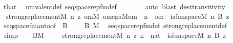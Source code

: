 \begin{isabellebody}
\ \ \ \ \isamarkupfalse%
\ that\ \isamarkupfalse%
\ univalent{\isacharunderscore}{\kern0pt}def\ seqspace{\isacharunderscore}{\kern0pt}rep{\isacharunderscore}{\kern0pt}fm{\isacharunderscore}{\kern0pt}def\ \ \isanewline
\ \ \ \ \isamarkupfalse%
\ {\isacharparenleft}{\kern0pt}auto{\isacharcomma}{\kern0pt}\ blast\ dest{\isacharcolon}{\kern0pt}transitivity{\isacharparenright}{\kern0pt}\isanewline
\ \ \isamarkupfalse%
\isanewline
\ \ \isamarkupfalse%
\ {\isachardoublequoteopen}strong{\isacharunderscore}{\kern0pt}replacement{\isacharparenleft}{\kern0pt}{\isacharhash}{\kern0pt}{\isacharhash}{\kern0pt}M{\isacharcomma}{\kern0pt}\ {\isasymlambda}n\ z{\isachardot}{\kern0pt}\ {\isasymexists}om{\isacharbrackleft}{\kern0pt}{\isacharhash}{\kern0pt}{\isacharhash}{\kern0pt}M{\isacharbrackright}{\kern0pt}{\isachardot}{\kern0pt}\ omega{\isacharparenleft}{\kern0pt}{\isacharhash}{\kern0pt}{\isacharhash}{\kern0pt}M{\isacharcomma}{\kern0pt}om{\isacharparenright}{\kern0pt}\ {\isasymand}\ n\ {\isasymin}\ om\ {\isasymand}\ is{\isacharunderscore}{\kern0pt}funspace{\isacharparenleft}{\kern0pt}{\isacharhash}{\kern0pt}{\isacharhash}{\kern0pt}M{\isacharcomma}{\kern0pt}\ n{\isacharcomma}{\kern0pt}\ B{\isacharcomma}{\kern0pt}\ z{\isacharparenright}{\kern0pt}{\isacharparenright}{\kern0pt}{\isachardoublequoteclose}\isanewline
\ \ \ \ \isamarkupfalse%
\ seqspace{\isacharunderscore}{\kern0pt}fm{\isacharunderscore}{\kern0pt}auto{\isacharbrackleft}{\kern0pt}of\ {}\ {\isachardoublequoteopen}{\isacharbrackleft}{\kern0pt}{\isacharunderscore}{\kern0pt}{\isacharcomma}{\kern0pt}{\isacharunderscore}{\kern0pt}{\isacharcomma}{\kern0pt}B{\isacharbrackright}{\kern0pt}{\isachardoublequoteclose}\ {\isacharunderscore}{\kern0pt}\ {}\ {\isacharunderscore}{\kern0pt}\ {}\ B\ M{\isacharbrackright}{\kern0pt}\ \isamarkupfalse%
\ seqspace{\isacharunderscore}{\kern0pt}rep{\isacharunderscore}{\kern0pt}fm{\isacharunderscore}{\kern0pt}def\ strong{\isacharunderscore}{\kern0pt}replacement{\isacharunderscore}{\kern0pt}def\isanewline
\ \ \ \ \isamarkupfalse%
\ simp\isanewline
\ \ \isamarkupfalse%
\ {\isacartoucheopen}B{\isasymin}M{\isacartoucheclose}\ \isanewline
\ \ \isamarkupfalse%
\ {\isachardoublequoteopen}strong{\isacharunderscore}{\kern0pt}replacement{\isacharparenleft}{\kern0pt}{\isacharhash}{\kern0pt}{\isacharhash}{\kern0pt}M{\isacharcomma}{\kern0pt}\ {\isasymlambda}n\ z{\isachardot}{\kern0pt}\ n\ {\isasymin}\ nat\ {\isasymand}\ is{\isacharunderscore}{\kern0pt}funspace{\isacharparenleft}{\kern0pt}{\isacharhash}{\kern0pt}{\isacharhash}{\kern0pt}M{\isacharcomma}{\kern0pt}\ n{\isacharcomma}{\kern0pt}\ B{\isacharcomma}{\kern0pt}\ z{\isacharparenright}{\kern0pt}{\isacharparenright}{\kern0pt}{\isachardoublequoteclose}\isanewline

\end{isabellebody}

